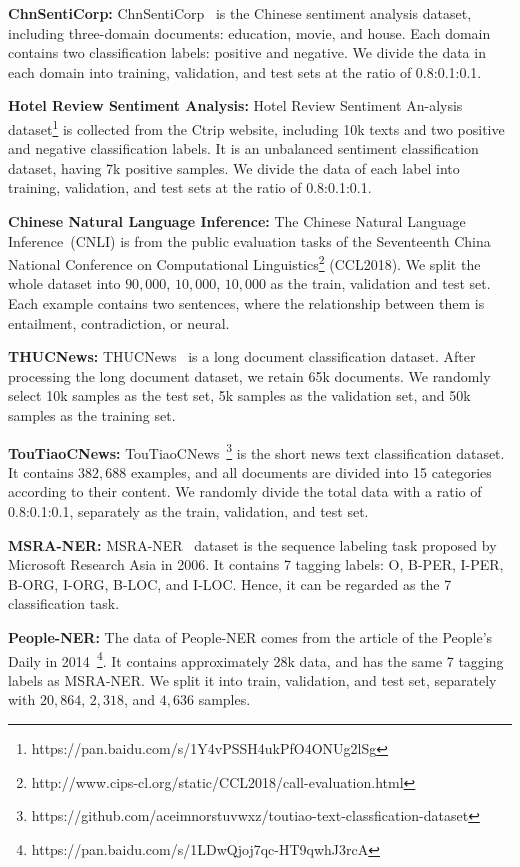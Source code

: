 \noindent\textbf{ChnSentiCorp:} ChnSentiCorp~\cite{chnSentiCorp} is the Chinese sentiment analysis dataset, including three-domain documents: education, movie, and house. Each domain contains two classification labels: positive and negative. We divide the data in each domain into training, validation, and test sets at the ratio of 0.8:0.1:0.1.

\noindent\textbf{Hotel Review Sentiment Analysis:} Hotel Review Sentiment An-alysis dataset\footnote{https://pan.baidu.com/s/1Y4vPSSH4ukPfO4ONUg2lSg} is collected from the Ctrip website, including 10k texts and two positive and negative classification labels. It is an unbalanced sentiment classification dataset, having 7k positive samples. We divide the data of each label into training, validation, and test sets at the ratio of 0.8:0.1:0.1. 

\noindent\textbf{Chinese Natural Language Inference:} The Chinese Natural Language Inference~(CNLI) is from the public evaluation tasks of the Seventeenth China National Conference on Computational Linguistics\footnote{http://www.cips-cl.org/static/CCL2018/call-evaluation.html} (CCL2018). We split the whole dataset into $90,000$, $10,000$, $10,000$ as the train, validation and test set. Each example contains two sentences, where the relationship between them is entailment, contradiction, or neural.

\noindent\textbf{THUCNews:} THUCNews~\cite{thunews} is a long document classification dataset. After processing the long document dataset, we retain 65k documents. We randomly select 10k samples as the test set, 5k samples as the validation set, and 50k samples as the training set. 

\noindent\textbf{TouTiaoCNews:} TouTiaoCNews~\footnote{https://github.com/aceimnorstuvwxz/toutiao-text-classfication-dataset} is the short news text classification dataset. It contains $382,688$ examples, and all documents are divided into 15 categories according to their content. We randomly divide the total data with a ratio of 0.8:0.1:0.1, separately as the train, validation, and test set. 

\noindent\textbf{MSRA-NER:} MSRA-NER~\cite{msra, nermsra} dataset is the sequence labeling task proposed by Microsoft Research Asia in 2006. It contains 7 tagging labels: O, B-PER, I-PER, B-ORG, I-ORG, B-LOC, and I-LOC. Hence, it can be regarded as the 7 classification task.

\noindent\textbf{People-NER:} The data of People-NER comes from the article of the People's Daily in 2014~\footnote{https://pan.baidu.com/s/1LDwQjoj7qc-HT9qwhJ3rcA}. It contains approximately 28k data, and has the same 7 tagging labels as MSRA-NER. We split it into train, validation, and test set, separately with $20,864$, $2,318$, and $4,636$ samples.

